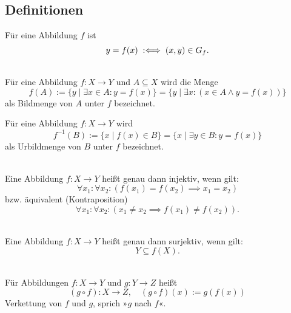 \subsection{Definitionen}

\begin{Definition}\label{def:app}
Für eine Abbildung $f$ ist
\[y=f(x)\;:\Longleftrightarrow\; (x,y)\in G_f.\]
\end{Definition}

\begin{Definition}%
\label{def:img}\mbox{}\\
Für eine Abbildung $f\colon X\to Y$ und $A\subseteq X$
wird die Menge
\[f(A) := \{y\mid \exists x\in A\colon y=f(x)\}
= \{y\mid \exists x\colon (x\in A\land y=f(x))\}\]
als Bildmenge von $A$ unter $f$ bezeichnet.
\end{Definition}

\begin{Definition}\label{def:preimg}
Für eine Abbildung $f\colon X\to Y$ wird
\[f^{-1}(B) := \{x\mid f(x)\in B\} = \{x\mid \exists y\in B\colon y=f(x)\}\]
als Urbildmenge von $B$ unter $f$ bezeichnet.
\end{Definition}

\begin{Definition}%
\label{def:inj}\mbox{}\\
Eine Abbildung $f\colon X\to Y$ heißt genau dann injektiv, wenn gilt:
\[\forall x_1\colon \forall x_2\colon (f(x_1)=f(x_2)\implies x_1=x_2)\]
bzw. äquivalent (Kontraposition)
\[\forall x_1\colon \forall x_2\colon (x_1\ne x_2\implies f(x_1)\ne f(x_2)).\]
\end{Definition}

\begin{Definition}%
\label{def:sur}\mbox{}\\
Eine Abbildung $f\colon X\to Y$ heißt genau dann surjektiv, wenn gilt:
\[Y\subseteq f(X).\]
\end{Definition}

\begin{Definition}\label{def:composition}%
\mbox{}\\
Für Abbildungen $f\colon X\to Y$ und $g\colon Y\to Z$ heißt
\[(g\circ f)\colon X\to Z,\quad (g\circ f)(x):=g(f(x))\]
Verkettung von $f$ und $g$, sprich »$g$ nach $f$«.
\end{Definition}

